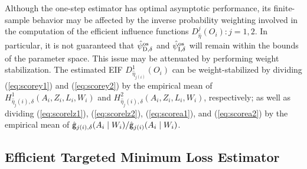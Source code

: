 Although the one-step estimator has optimal asymptotic performance, its
finite-sample behavior may be affected by the inverse probability weighting
involved in the computation of the efficient influence functions
$D_{\hat\eta}^j(O_i):j=1,2$. In particular, it is not guaranteed that $\hat\psi_{\mbox{\scriptsize D}, \delta}^{\mbox{\scriptsize os}}$
and $\hat\psi_{\mbox{\scriptsize I}, \delta}^{\mbox{\scriptsize os}}$ will remain within the bounds of the parameter space. This issue
may be attenuated by performing weight stabilization. The estimated EIF
$D_{\hat\eta_{j(i)}}^1(O_i)$ can be weight-stabilized by dividing
(\ref{eq:scorey1}) and (\ref{eq:scorey2}) by the empirical mean of
$H_{\hat\eta_j(i),\delta}^1(A_i,Z_i,L_i,W_i)$ and
$H_{\hat\eta_j(i),\delta}^2(A_i,Z_i,L_i,W_i)$, respectively; as well as dividing
(\ref{eq:scorelz1}), (\ref{eq:scorelz2}), (\ref{eq:scorea1}), and
(\ref{eq:scorea2}) by the empirical mean of $\hat {\mathsf{g}}_{j(i), \delta}(A_i\mid
W_i)/\hat {\mathsf{g}}_{j(i)}(A_i\mid W_i)$.

\subsection{Efficient Targeted Minimum Loss Estimator}

